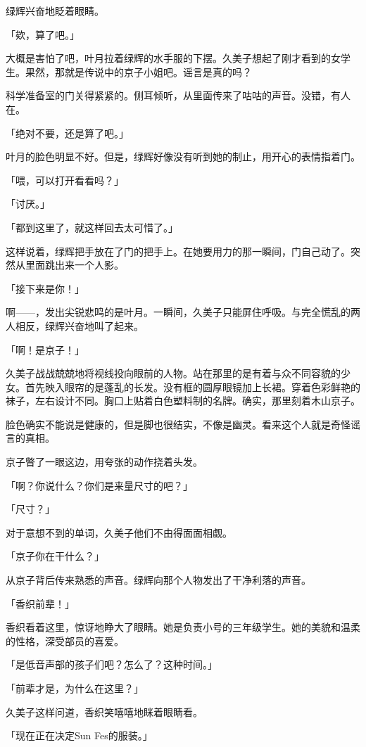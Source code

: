 \documentclass[UTF8]{ctexart}
\begin{document}
    绿辉兴奋地眨着眼睛。

    「欸，算了吧。」

    大概是害怕了吧，叶月拉着绿辉的水手服的下摆。久美子想起了刚才看到的女学生。果然，那就是传说中的京子小姐吧。谣言是真的吗？

    科学准备室的门关得紧紧的。侧耳倾听，从里面传来了咕咕的声音。没错，有人在。

    「绝对不要，还是算了吧。」

    叶月的脸色明显不好。但是，绿辉好像没有听到她的制止，用开心的表情指着门。

    「喂，可以打开看看吗？」

    「讨厌。」

    「都到这里了，就这样回去太可惜了。」

    这样说着，绿辉把手放在了门的把手上。在她要用力的那一瞬间，门自己动了。突然从里面跳出来一个人影。

    「接下来是你！」

    啊——，发出尖锐悲鸣的是叶月。一瞬间，久美子只能屏住呼吸。与完全慌乱的两人相反，绿辉兴奋地叫了起来。

    「啊！是京子！」

    久美子战战兢兢地将视线投向眼前的人物。站在那里的是有着与众不同容貌的少女。首先映入眼帘的是蓬乱的长发。没有框的圆厚眼镜加上长裙。穿着色彩鲜艳的袜子，左右设计不同。胸口上贴着白色塑料制的名牌。确实，那里刻着木山京子。

    脸色确实不能说是健康的，但是脚也很结实，不像是幽灵。看来这个人就是奇怪谣言的真相。

    京子瞥了一眼这边，用夸张的动作挠着头发。

    「啊？你说什么？你们是来量尺寸的吧？」

    「尺寸？」

    对于意想不到的单词，久美子他们不由得面面相觑。

    「京子你在干什么？」

    从京子背后传来熟悉的声音。绿辉向那个人物发出了干净利落的声音。

    「香织前辈！」

    香织看着这里，惊讶地睁大了眼睛。她是负责小号的三年级学生。她的美貌和温柔的性格，深受部员的喜爱。

    「是低音声部的孩子们吧？怎么了？这种时间。」

    「前辈才是，为什么在这里？」

    久美子这样问道，香织笑嘻嘻地眯着眼睛看。

    「现在正在决定Sun Fes的服装。」
\end{document}

